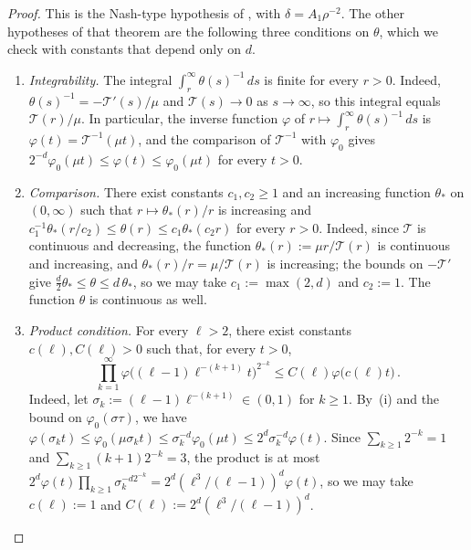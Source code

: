 \documentclass[11pt]{amsart}
\numberwithin{equation}{section}
\begin{document}
\begin{proof}
This is the Nash-type hypothesis of \citet[Theorem~4.4]{ChenKimKumagaiWang2021}, with $\delta = A_1 \rho^{-2}$.
The other hypotheses of that theorem are the following three conditions on $\theta$, which we check with constants that depend only on $d$.
\begin{enumerate}
    \item[\textup{(i)}] \emph{Integrability.} The integral $\int_r^\infty \theta(s)^{-1} \, ds$ is finite for every $r > 0$.
    Indeed, $\theta(s)^{-1} = - \mathcal{T}'(s)/\mu$ and $\mathcal{T}(s) \to 0$ as $s \to \infty$, so this integral equals $\mathcal{T}(r)/\mu$.
    In particular, the inverse function $\varphi$ of $r \mapsto \int_r^\infty \theta(s)^{-1} \, ds$ is $\varphi(t) = \mathcal{T}^{-1}(\mu t)$, and the comparison of $\mathcal{T}^{-1}$ with $\varphi_0$ gives $2^{-d} \varphi_0(\mu t) \leq \varphi(t) \leq \varphi_0(\mu t)$ for every $t > 0$.
    \item[\textup{(ii)}] \emph{Comparison.} There exist constants $c_1, c_2 \geq 1$ and an increasing function $\theta_*$ on $(0, \infty)$ such that $r \mapsto \theta_*(r)/r$ is increasing and $c_1^{-1} \theta_*(r/c_2) \leq \theta(r) \leq c_1 \theta_*(c_2 r)$ for every $r > 0$.
    Indeed, since $\mathcal{T}$ is continuous and decreasing, the function $\theta_*(r) := \mu r / \mathcal{T}(r)$ is continuous and increasing, and $\theta_*(r)/r = \mu / \mathcal{T}(r)$ is increasing; the bounds on $-\mathcal{T}'$ give $\frac{d}{2} \theta_* \leq \theta \leq d \, \theta_*$, so we may take $c_1 := \max(2, d)$ and $c_2 := 1$.
    The function $\theta$ is continuous as well.
    \item[\textup{(iii)}] \emph{Product condition.} For every $\ell > 2$, there exist constants $c(\ell), C(\ell) > 0$ such that, for every $t > 0$,
    \begin{equation*}
        \prod_{k=1}^\infty \varphi \bigl( (\ell - 1) \ell^{-(k+1)} t \bigr)^{2^{-k}} \leq C(\ell) \varphi \bigl( c(\ell) t \bigr)\,.
    \end{equation*}
    Indeed, let $\sigma_k := (\ell - 1) \ell^{-(k+1)} \in (0, 1)$ for $k \geq 1$.
    By~(i) and the bound on $\varphi_0(\sigma \tau)$, we have $\varphi(\sigma_k t) \leq \varphi_0(\mu \sigma_k t) \leq \sigma_k^{-d} \varphi_0(\mu t) \leq 2^d \sigma_k^{-d} \varphi(t)$.
    Since $\sum_{k \geq 1} 2^{-k} = 1$ and $\sum_{k \geq 1} (k+1) 2^{-k} = 3$, the product is at most $2^d \varphi(t) \prod_{k \geq 1} \sigma_k^{-d 2^{-k}} = 2^d (\ell^3/(\ell - 1))^d \varphi(t)$, so we may take $c(\ell) := 1$ and $C(\ell) := 2^d (\ell^3/(\ell - 1))^d$.

\end{enumerate}
\end{proof}
\end{document}
